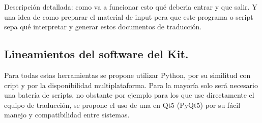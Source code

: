 Descripción detallada: como va a funcionar esto qué deberia entrar y que salir. Y una idea de como preparar el material de input pera que este programa o script sepa qué interpretar y generar estos documentos de traducción.

\subsection{Lineamientos del software del Kit.}
Para todas estas herramientas se propone utilizar Python, por su similitud con cript y por la disponibilidad multiplataforma. Para la mayoría solo será necesario una batería de scripts, no obstante por ejemplo para los que use directamente el equipo de traducción, se propone el uso de una  en Qt5 (PyQt5) por su fácil manejo y compatibilidad entre sistemas.